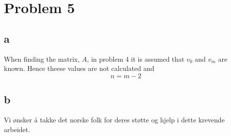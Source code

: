 \documentclass[english,notitlepage]{revtex4-1}  %
\begin{document}
\section*{Problem 5}
    \subsection*{a}
        \label{sec:oppgave5a}
        When finding the matrix, $A$, in problem 4 it is assumed that $v_0$ and $v_m$ are known.
        Hence theese values are not calculated and
        \begin{equation*}
                n
            =   m - 2
        \end{equation*}
    \subsection*{b}
        \label{sec:oppgave5b}

\begin{acknowledgements}
Vi ønsker å takke det norske folk for deres støtte og hjelp i dette krevende arbeidet. 
\end{acknowledgements}

   
\end{document}
